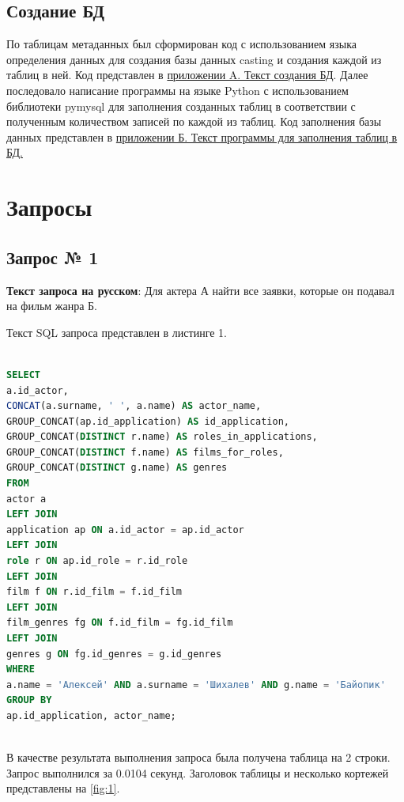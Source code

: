 \documentclass[11pt,a4paper,final]{article} %
\begin{document}
\subsection{Создание БД}
\par По таблицам метаданных был сформирован код с использованием языка определения данных для создания базы данных casting и создания каждой из таблиц в ней. Код представлен в \hyperref[sec:appendixA]{приложении A. Текст создания БД}. Далее последовало написание программы на языке Python с использованием библиотеки pymysql для заполнения созданных таблиц в соответствии с полученным количеством записей по каждой из таблиц. Код заполнения базы данных представлен в \hyperref[sec:appendixB]{приложении Б. Текст программы для заполнения таблиц в БД.}

\newpage
\section{Запросы}	

\subsection{Запрос № 1}

\par \textbf{Текст запроса на русском}: Для актера А найти все заявки, которые он подавал на фильм жанра Б. 
\par Текст SQL запроса представлен в листинге 1.

\begin{lstlisting}[caption=SQL запрос № 1, language=SQL]
		
SELECT 
a.id_actor,
CONCAT(a.surname, ' ', a.name) AS actor_name,
GROUP_CONCAT(ap.id_application) AS id_application,
GROUP_CONCAT(DISTINCT r.name) AS roles_in_applications,
GROUP_CONCAT(DISTINCT f.name) AS films_for_roles,
GROUP_CONCAT(DISTINCT g.name) AS genres
FROM 
actor a
LEFT JOIN 
application ap ON a.id_actor = ap.id_actor
LEFT JOIN 
role r ON ap.id_role = r.id_role
LEFT JOIN 
film f ON r.id_film = f.id_film
LEFT JOIN 
film_genres fg ON f.id_film = fg.id_film
LEFT JOIN 
genres g ON fg.id_genres = g.id_genres
WHERE 
a.name = 'Алексей' AND a.surname = 'Шихалев' AND g.name = 'Байопик'
GROUP BY 
ap.id_application, actor_name;
	
\end{lstlisting}
 

В качестве результата выполнения запроса была получена таблица на 2 строки. Запрос выполнился за 0.0104 секунд. Заголовок таблицы и несколько кортежей представлены на \autoref{fig:1}.
\end{document}
